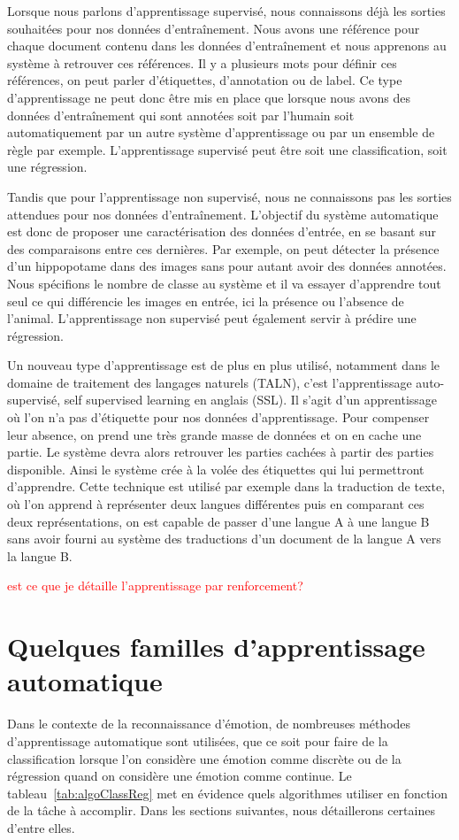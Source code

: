Lorsque nous parlons d'apprentissage supervisé, nous connaissons déjà les sorties souhaitées pour nos données d’entraînement. Nous avons une référence pour chaque document contenu dans les données d’entraînement et nous apprenons au système à retrouver ces références.
Il y a plusieurs mots pour définir ces références, on peut parler d'étiquettes, d'annotation ou de label. Ce type d'apprentissage ne peut donc être mis en place que lorsque nous avons des données d’entraînement qui sont annotées soit par l'humain soit automatiquement par un autre système d'apprentissage ou par un ensemble de règle par exemple. L'apprentissage supervisé peut être soit une classification, soit une régression.

Tandis que pour l'apprentissage non supervisé, nous ne connaissons pas les sorties attendues pour nos données d’entraînement. L'objectif du système automatique est donc de proposer une caractérisation des données d'entrée, en se basant sur des comparaisons entre ces dernières. Par exemple, on peut détecter la présence d'un hippopotame dans des images sans pour autant avoir des données annotées. Nous spécifions le nombre de classe au système et il va essayer d'apprendre tout seul ce qui différencie les images en entrée, ici la présence ou l'absence de l'animal. L'apprentissage non supervisé peut également servir à prédire une régression.

Un nouveau type d'apprentissage est de plus en plus utilisé, notamment dans le domaine de traitement des langages naturels (TALN), c'est l'apprentissage auto-supervisé, self supervised learning en anglais (SSL). Il s'agit d'un apprentissage où l'on n'a pas d'étiquette pour nos données d'apprentissage. Pour compenser leur absence, on prend une très grande masse de données et on en cache une partie. Le système devra alors retrouver les parties cachées à partir des parties disponible. Ainsi le système crée à la volée des étiquettes qui lui permettront d'apprendre.
Cette technique est utilisé par exemple dans la traduction de texte, où l'on apprend à représenter deux langues différentes puis en comparant ces deux représentations, on est capable de passer d'une langue A à une langue B sans avoir fourni au système des traductions d'un document de la langue A vers la langue B.

\textcolor{red}{est ce que je détaille l'apprentissage par renforcement?}

\section{Quelques familles d'apprentissage automatique}
Dans le contexte de la reconnaissance d'émotion, de nombreuses méthodes d'apprentissage automatique sont utilisées, que ce soit pour faire de la classification lorsque l'on considère une émotion comme discrète ou de la régression quand on considère une émotion comme continue.
Le tableau~\ref{tab:algoClassReg} met en évidence quels algorithmes utiliser en fonction de la tâche à accomplir. Dans les sections suivantes, nous détaillerons certaines d'entre elles.

